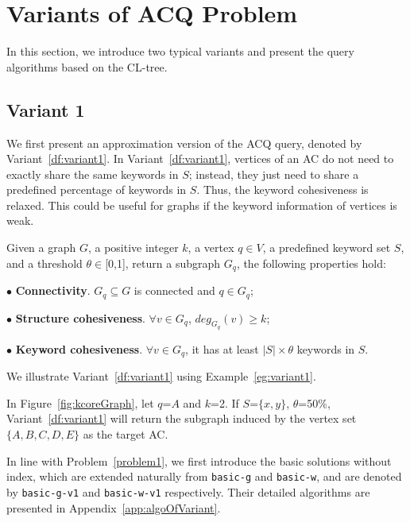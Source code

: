 {\color{blue}
\section{Variants of ACQ Problem}
\label{variant}

In this section, we introduce two typical variants and present the query algorithms based on the CL-tree.


\subsection{Variant 1}

We first present an approximation version of the ACQ query, denoted by Variant~\ref{df:variant1}.
In Variant~\ref{df:variant1}, vertices of an AC do not need to exactly share the same keywords in $S$;
instead, they just need to share a predefined percentage of keywords in $S$.
Thus, the keyword cohesiveness is relaxed.
This could be useful for graphs if the keyword information of vertices is weak.

\begin{variant}
\label{df:variant1}
Given a graph $G$, a positive integer $k$, a vertex $q \in V$, a predefined keyword set $S$,
and a threshold $\theta\in$[0,1], return a subgraph $G_q$, the following properties hold:

$\bullet$ \textbf{Connectivity}. $G_q \subseteq G$ is connected and $q\in G_q$;

$\bullet$ \textbf{Structure cohesiveness}. $\forall$$v\in G_q$, $deg_{G_q}(v)\geq$$k$;

$\bullet$ \textbf{Keyword cohesiveness}. $\forall v\in G_q$, it has at least $|S|\times \theta$ keywords in $S$.
\end{variant}

We illustrate Variant~\ref{df:variant1} using Example~\ref{eg:variant1}.
\begin{example}
\label{eg:variant1}
In Figure~\ref{fig:kcoreGraph}, let $q$=$A$ and $k$=2.
If $S$=$\{x,y\}$, $\theta$=50\%, Variant~\ref{df:variant1} will return the subgraph induced by the vertex set $\{A,B,C,D,E\}$ as the target AC.
\end{example}

In line with Problem~\ref{problem1}, we first introduce the basic solutions without index,
which are extended naturally from {\tt basic-g} and {\tt basic-w},
and are denoted by {\tt basic-g-v1} and {\tt basic-w-v1} respectively.
Their detailed algorithms are presented in Appendix~\ref{app:algoOfVariant}.

}
